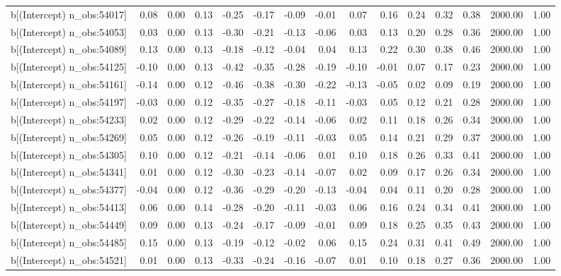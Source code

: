 \begin{table}[ht]
\begin{tabular}{rrrrrrrrrrrrrrr}
  b[(Intercept) n\_obs:54017] & 0.08 & 0.00 & 0.13 & -0.25 & -0.17 & -0.09 & -0.01 & 0.07 & 0.16 & 0.24 & 0.32 & 0.38 & 2000.00 & 1.00 \\ 
  b[(Intercept) n\_obs:54053] & 0.03 & 0.00 & 0.13 & -0.30 & -0.21 & -0.13 & -0.06 & 0.03 & 0.13 & 0.20 & 0.28 & 0.36 & 2000.00 & 1.00 \\ 
  b[(Intercept) n\_obs:54089] & 0.13 & 0.00 & 0.13 & -0.18 & -0.12 & -0.04 & 0.04 & 0.13 & 0.22 & 0.30 & 0.38 & 0.46 & 2000.00 & 1.00 \\ 
  b[(Intercept) n\_obs:54125] & -0.10 & 0.00 & 0.13 & -0.42 & -0.35 & -0.28 & -0.19 & -0.10 & -0.01 & 0.07 & 0.17 & 0.23 & 2000.00 & 1.00 \\ 
  b[(Intercept) n\_obs:54161] & -0.14 & 0.00 & 0.12 & -0.46 & -0.38 & -0.30 & -0.22 & -0.13 & -0.05 & 0.02 & 0.09 & 0.19 & 2000.00 & 1.00 \\ 
  b[(Intercept) n\_obs:54197] & -0.03 & 0.00 & 0.12 & -0.35 & -0.27 & -0.18 & -0.11 & -0.03 & 0.05 & 0.12 & 0.21 & 0.28 & 2000.00 & 1.00 \\ 
  b[(Intercept) n\_obs:54233] & 0.02 & 0.00 & 0.12 & -0.29 & -0.22 & -0.14 & -0.06 & 0.02 & 0.11 & 0.18 & 0.26 & 0.34 & 2000.00 & 1.00 \\ 
  b[(Intercept) n\_obs:54269] & 0.05 & 0.00 & 0.12 & -0.26 & -0.19 & -0.11 & -0.03 & 0.05 & 0.14 & 0.21 & 0.29 & 0.37 & 2000.00 & 1.00 \\ 
  b[(Intercept) n\_obs:54305] & 0.10 & 0.00 & 0.12 & -0.21 & -0.14 & -0.06 & 0.01 & 0.10 & 0.18 & 0.26 & 0.33 & 0.41 & 2000.00 & 1.00 \\ 
  b[(Intercept) n\_obs:54341] & 0.01 & 0.00 & 0.12 & -0.30 & -0.23 & -0.14 & -0.07 & 0.02 & 0.09 & 0.17 & 0.26 & 0.34 & 2000.00 & 1.00 \\ 
  b[(Intercept) n\_obs:54377] & -0.04 & 0.00 & 0.12 & -0.36 & -0.29 & -0.20 & -0.13 & -0.04 & 0.04 & 0.11 & 0.20 & 0.28 & 2000.00 & 1.00 \\ 
  b[(Intercept) n\_obs:54413] & 0.06 & 0.00 & 0.14 & -0.28 & -0.20 & -0.11 & -0.03 & 0.06 & 0.16 & 0.24 & 0.34 & 0.41 & 2000.00 & 1.00 \\ 
  b[(Intercept) n\_obs:54449] & 0.09 & 0.00 & 0.13 & -0.24 & -0.17 & -0.09 & -0.01 & 0.09 & 0.18 & 0.25 & 0.35 & 0.43 & 2000.00 & 1.00 \\ 
  b[(Intercept) n\_obs:54485] & 0.15 & 0.00 & 0.13 & -0.19 & -0.12 & -0.02 & 0.06 & 0.15 & 0.24 & 0.31 & 0.41 & 0.49 & 2000.00 & 1.00 \\ 
  b[(Intercept) n\_obs:54521] & 0.01 & 0.00 & 0.13 & -0.33 & -0.24 & -0.16 & -0.07 & 0.01 & 0.10 & 0.18 & 0.27 & 0.36 & 2000.00 & 1.00 \\ 

\end{tabular}
\end{table}
